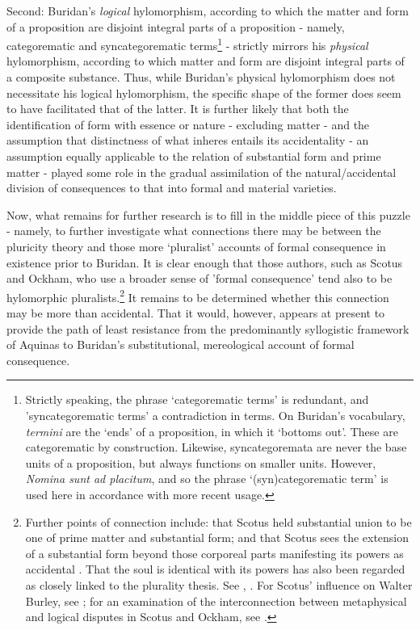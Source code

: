 \documentclass[]{article}
\begin{document}
Second: Buridan's \textit{logical} hylomorphism, according to which the matter and form of a proposition are disjoint integral parts of a proposition - namely, categorematic and syncategorematic terms\footnote{Strictly speaking, the phrase `categorematic terms' is redundant, and 'syncategorematic terms' a contradiction in terms. On Buridan's vocabulary, \textit{termini} are the `ends' of a proposition, in which it `bottoms out'. These are categorematic by construction. Likewise, syncategoremata are never the base units of a proposition, but always functions on smaller units. However, \textit{Nomina sunt ad placitum}, and so the phrase `(syn)categorematic term' is used here in accordance with more recent usage.}  - strictly mirrors his \textit{physical} hylomorphism, according to which matter and form are disjoint integral parts of a composite substance. Thus, while Buridan's physical hylomorphism does not necessitate his logical hylomorphism, the specific shape of the former does seem to have facilitated that of the latter. It is further likely that both the identification of form with essence or nature - excluding matter - and the assumption that distinctness of what inheres entails its accidentality - an assumption equally applicable to the relation of substantial form and prime matter - played some role in the gradual assimilation of the natural/accidental division of consequences to that into formal and material varieties.

Now, what remains for further research is to fill in the middle piece of this puzzle - namely, to further investigate what connections there may be between the pluricity theory and those more `pluralist' accounts of formal consequence in existence prior to Buridan. It is clear enough that those authors, such as Scotus and Ockham, who use a broader sense of 'formal consequence' tend also to be hylomorphic pluralists.\footnote{Further points of connection include: that Scotus held substantial union to be one of prime matter and substantial form\autocite[138]{Cross1995}; and that Scotus sees the extension of a substantial form beyond those corporeal parts manifesting its powers as accidental \autocite[VII.20, par. 19, pp. 383-384]{ScotusMetaph}. That the soul is identical with its powers has also been regarded as closely linked to the plurality thesis. See \autocite[242-243]{Weisheipl1980}, \autocite[I, p. 335]{DeWulf1926}. For Scotus' influence on Walter Burley, see \autocite{Ottman1999}; for an examination of the interconnection between metaphysical and logical disputes in Scotus and Ockham, see \autocite{Martin2004}.} It remains to be determined whether this connection may be more than accidental. That it would, however, appears at present to provide the path of least resistance from the predominantly syllogistic framework of Aquinas to Buridan's substitutional, mereological account of formal consequence.
\end{document}
